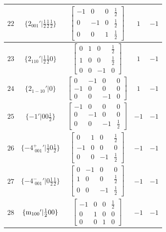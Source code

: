 \documentclass[fleqn,8pt]{jsarticle}
\begin{document}
\begin{longtable}{ccccc}
$ 22 $ & $ \{2{}_{001}{}'|\frac{1}{2} \frac{1}{2} \frac{1}{2}\} $ & $ \begin{bmatrix} -1 & 0 & 0 & \frac{1}{2} \\ 0 & -1 & 0 & \frac{1}{2} \\ 0 & 0 & 1 & \frac{1}{2} \end{bmatrix} $ & $ 1 $ & $ -1 $ \\ \hline
$ 23 $ & $ \{2{}_{110}{}'|\frac{1}{2} \frac{1}{2} 0\} $ & $ \begin{bmatrix} 0 & 1 & 0 & \frac{1}{2} \\ 1 & 0 & 0 & \frac{1}{2} \\ 0 & 0 & -1 & 0 \end{bmatrix} $ & $ 1 $ & $ -1 $ \\ \hline
$ 24 $ & $ \{2{}_{1-10}{}'|0\} $ & $ \begin{bmatrix} 0 & -1 & 0 & 0 \\ -1 & 0 & 0 & 0 \\ 0 & 0 & -1 & 0 \end{bmatrix} $ & $ 1 $ & $ -1 $ \\ \hline
$ 25 $ & $ \{-1{}'|0 0 \frac{1}{2}\} $ & $ \begin{bmatrix} -1 & 0 & 0 & 0 \\ 0 & -1 & 0 & 0 \\ 0 & 0 & -1 & \frac{1}{2} \end{bmatrix} $ & $ -1 $ & $ -1 $ \\ \hline
$ 26 $ & $ \{-4^{+}_{\,\,001}{}'|\frac{1}{2} 0 \frac{1}{2}\} $ & $ \begin{bmatrix} 0 & 1 & 0 & \frac{1}{2} \\ -1 & 0 & 0 & 0 \\ 0 & 0 & -1 & \frac{1}{2} \end{bmatrix} $ & $ -1 $ & $ -1 $ \\ \hline
$ 27 $ & $ \{-4^{-}_{\,\,001}{}'|0 \frac{1}{2} \frac{1}{2}\} $ & $ \begin{bmatrix} 0 & -1 & 0 & 0 \\ 1 & 0 & 0 & \frac{1}{2} \\ 0 & 0 & -1 & \frac{1}{2} \end{bmatrix} $ & $ -1 $ & $ -1 $ \\ \hline
$ 28 $ & $ \{{\rm m}_{100}{}'|\frac{1}{2} 0 0\} $ & $ \begin{bmatrix} -1 & 0 & 0 & \frac{1}{2} \\ 0 & 1 & 0 & 0 \\ 0 & 0 & 1 & 0 \end{bmatrix} $ & $ -1 $ & $ -1 $ \\ \hline

\end{longtable}
\end{document}
